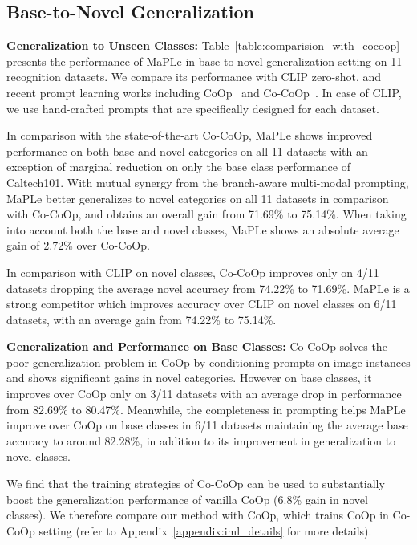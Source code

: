 \documentclass[10pt,twocolumn,letterpaper]{article}
\begin{document}
\subsection{Base-to-Novel Generalization}
\label{lab:comparision_base_to_new}
\noindent \textbf{Generalization to Unseen Classes:} Table~\ref{table:comparision_with_cocoop} presents the performance of MaPLe in base-to-novel generalization setting on 11 recognition datasets. We compare its performance with CLIP zero-shot, and recent prompt learning works including CoOp~\cite{zhou2022learning} and Co-CoOp~\cite{zhou2022conditional}. In case of CLIP, we use hand-crafted prompts that are specifically designed for each dataset.

In comparison with the state-of-the-art Co-CoOp, MaPLe shows improved performance on both base and novel categories on all 11 datasets with an exception of marginal reduction on only the base class performance of Caltech101. With mutual synergy from the branch-aware multi-modal prompting, MaPLe better generalizes to novel categories on all 11 datasets in comparison with Co-CoOp, and obtains an overall gain from 71.69\% to 75.14\%. When taking into account both the base and novel classes, MaPLe shows an absolute average gain of 2.72\% over Co-CoOp. 

In comparison with CLIP on novel classes, Co-CoOp improves only on 4/11 datasets dropping the average novel accuracy from 74.22\% to 71.69\%. MaPLe is a strong competitor which improves accuracy over CLIP on novel classes on 6/11 datasets, with an average gain from 74.22\% to 75.14\%.

\noindent \textbf{Generalization and Performance on Base Classes:} 
Co-CoOp solves the poor generalization problem in CoOp by conditioning prompts on image instances and shows significant gains in novel categories. However on base classes, it improves over CoOp only on 3/11 datasets with an average drop in performance from 82.69\% to 80.47\%. Meanwhile, the completeness in prompting helps MaPLe improve over CoOp on base classes in 6/11 datasets maintaining the average base accuracy to around 82.28\%, in addition to its improvement in generalization to novel classes.

We find that the training strategies of Co-CoOp can be used to substantially boost the generalization performance of vanilla CoOp (6.8\% gain in novel classes). We therefore compare our method with CoOp, which trains CoOp in Co-CoOp setting (refer to Appendix~\ref{appendix:iml_details} for more details).
\end{document}
